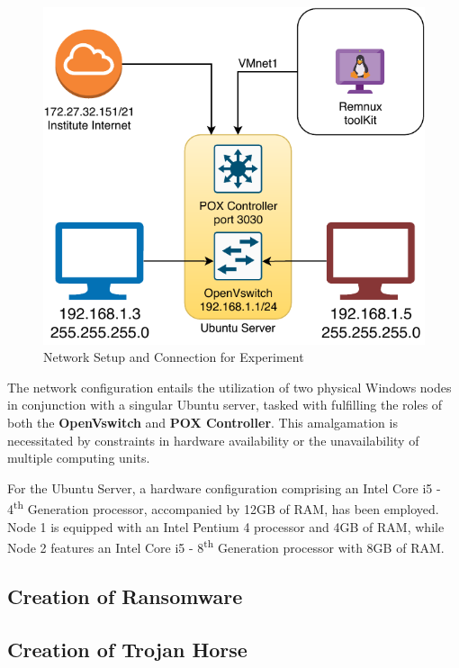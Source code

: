 \documentclass[12pt,letterpaper]{article}
\begin{document}
        \begin{figure}[htt]
            \centering
            \includegraphics{images/NetworkSetip.drawio.pdf}
            \caption{Network Setup and Connection for Experiment}
            \label{fig:Network Setup and Connection for Experiment}
        \end{figure}

        The network configuration entails the utilization of two physical Windows nodes in conjunction with a singular Ubuntu server, tasked with fulfilling the roles of both the \textbf{OpenVswitch} and \textbf{POX Controller}. This amalgamation is necessitated by constraints in hardware availability or the unavailability of multiple computing units.

        For the Ubuntu Server, a hardware configuration comprising an Intel Core i5 - 4\textsuperscript{th} Generation processor, accompanied by 12GB of RAM, has been employed. Node 1 is equipped with an Intel Pentium 4 processor and 4GB of RAM, while Node 2 features an Intel Core i5 - 8\textsuperscript{th} Generation processor with 8GB of RAM.


        \subsection{Creation of Ransomware}

        

        \subsection{Creation of Trojan Horse}
\end{document}
